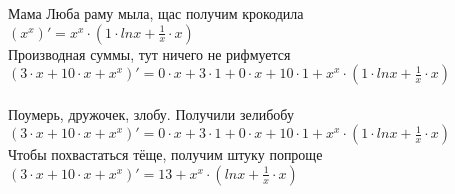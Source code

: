 \documentclass[a4paper,12pt]{article}
\begin{document}
Мама Люба раму мыла, щас получим крокодила\\
\begin{math}
	(x ^{x} )' = x ^{x}  \cdot (1 \cdot  ln x  +  \frac{1}{x}  \cdot x)
\end{math}\\
Производная суммы, тут ничего не рифмуется\\
\begin{math}
	(3 \cdot x + 10 \cdot x + x ^{x} )' = 0 \cdot x + 3 \cdot 1 + 0 \cdot x + 10 \cdot 1 + x ^{x}  \cdot (1 \cdot  ln x  +  \frac{1}{x}  \cdot x)
\end{math}\\
\\Поумерь, дружочек, злобу. Получили зелибобу\\ $(3 \cdot x + 10 \cdot x + x ^{x} )' = 0 \cdot x + 3 \cdot 1 + 0 \cdot x + 10 \cdot 1 + x ^{x}  \cdot (1 \cdot  ln x  +  \frac{1}{x}  \cdot x)$\\
Чтобы похвастаться тёще, получим штуку попроще\\
$(3 \cdot x + 10 \cdot x + x ^{x} )' = 13 + x ^{x}  \cdot ( ln x  +  \frac{1}{x}  \cdot x)$\\
\end{document}
